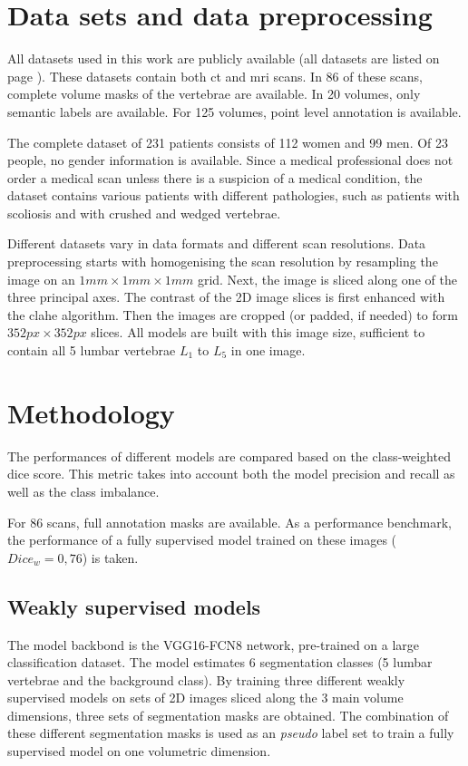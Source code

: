 \begin{multicols}{2}
\section*{Data sets and data preprocessing \label{sec:abstr_data}}
\par{
    All datasets used in this work are publicly available (all datasets are listed on page \pageref{sec:datasets}). 
    These datasets contain both \acrshort{ct} and \acrshort{mri} scans. 
    In 86 of these scans, complete volume masks of the vertebrae are available. 
    In 20 volumes, only semantic labels are available.
    For 125 volumes, point level annotation is available.
}
\par{
    The complete dataset of 231 patients consists of 112 women and 99 men. Of 23 people, no gender information is available. 
    Since a medical professional does not order a medical scan unless there is a suspicion of a medical condition, the dataset contains various patients with different pathologies,
    such as patients with scoliosis and with crushed and wedged vertebrae.
}
\par{
    Different datasets vary in data formats and different scan resolutions. 
    Data preprocessing starts with homogenising the scan resolution by resampling the image on an $1mm\times 1mm\times 1mm$ grid. 
    Next, the image is sliced along one of the three principal axes.
    The contrast of the 2D image slices is first enhanced with the \acrfull{clahe} algorithm.
    Then the images are cropped (or padded, if needed) to form $352 px \times 352 px$ slices.
    All models are built with this image size, sufficient to contain all 5 lumbar vertebrae $L_1$ to $L_5$ in one image.
}


\section*{Methodology}
\par{
    The performances of different models are compared based on the class-weighted dice score.
    This metric takes into account both the model precision and recall as well as the class imbalance.
}
\par{
    For 86 scans, full annotation masks are available.
    As a performance benchmark, the performance of a fully supervised model trained on these images ($Dice_w=0,76$) is taken.
}
\subsection*{Weakly supervised models}
\par{
    The model backbond is the VGG16-FCN8 network, pre-trained on a large classification dataset.
    The model estimates 6 segmentation classes (5 lumbar vertebrae and the background class). 
    By training three different weakly supervised models on sets of 2D images sliced along the 3 main volume dimensions, three sets of segmentation masks are obtained. 
    The combination of these different segmentation masks is used as an \textit{pseudo} label set to train a fully supervised model on one volumetric dimension.
}


\end{multicols}
